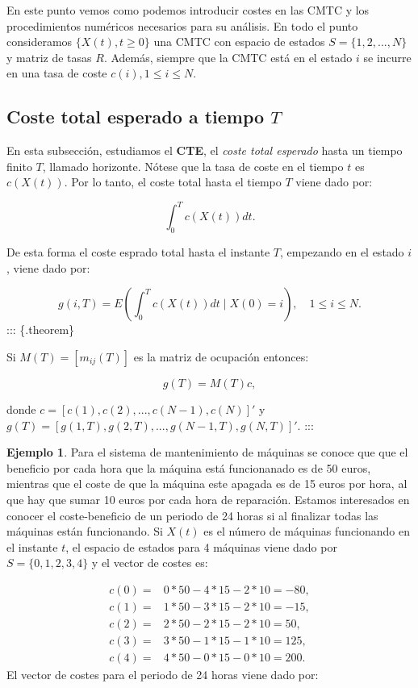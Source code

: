 \documentclass[
]{book}
\theoremstyle{definition}
\theoremstyle{definition}
\newtheorem{example}{Ejemplo}[chapter]
\theoremstyle{definition}
\theoremstyle{definition}
\theoremstyle{remark}
\begin{document}
En este punto vemos como podemos introducir costes en las CMTC y los procedimientos numéricos necesarios para su análisis. En todo el punto consideramos \(\{X(t), t \geq 0\}\) una CMTC con espacio de estados \(S = \{1, 2,...,N\}\) y matriz de tasas \(R\). Además, siempre que la CMTC está en el estado \(i\) se incurre en una tasa de coste \(c(i), 1 \leq i \leq N\).

\hypertarget{coste-total-esperado-a-tiempo-t}{%
\subsection{\texorpdfstring{Coste total esperado a tiempo \(T\)}{Coste total esperado a tiempo T}}\label{coste-total-esperado-a-tiempo-t}}

En esta subsección, estudiamos el \textbf{CTE}, el \emph{coste total esperado} hasta un tiempo finito \(T\), llamado horizonte. Nótese que la tasa de coste en el tiempo \(t\) es \(c(X(t))\). Por lo tanto, el coste total hasta el tiempo \(T\) viene dado por:

\[\int_0^T c(X(t))dt.\]

De esta forma el coste esprado total hasta el instante \(T\), empezando en el estado \(i\), viene dado por:

\[g(i, T) = E\left( \int_0^T c(X(t))dt \mid X(0) = i \right), \quad 1 \leq i \leq N.\] ::: \{.theorem\}

Si \(M(T) = [m_{ij}(T)]\) es la matriz de ocupación entonces:

\[g(T) = M(T)c,\]

donde \(c = [c(1), c(2),...,c(N-1), c(N)]'\) y \(g(T) = [g(1, T), g(2,T),..., g(N-1, T), g(N, T)]'.\) :::

\begin{example}
Para el sistema de mantenimiento de máquinas se conoce que que el beneficio por cada hora que la máquina está funcionanado es de 50 euros, mientras que el coste de que la máquina este apagada es de 15 euros por hora, al que hay que sumar 10 euros por cada hora de reparación. Estamos interesados en conocer el coste-beneficio de un periodo de 24 horas si al finalizar todas las máquinas están funcionando. Si \(X(t)\) es el número de máquinas funcionando en el instante \(t\), el espacio de estados para 4 máquinas viene dado por \(S = \{0, 1, 2, 3, 4\}\) y el vector de costes es:
\end{example}

\[
\begin{matrix}
c(0) = & 0*50 - 4*15 - 2*10 = - 80,\\
c(1) = & 1*50 - 3*15 - 2*10 = - 15,\\
c(2) = & 2*50 - 2*15 - 2*10 = 50,\\
c(3) = & 3*50 - 1*15 - 1*10 = 125,\\
c(4) = & 4*50 - 0*15 - 0*10 = 200.
\end{matrix}
\] El vector de costes para el periodo de 24 horas viene dado por:
\end{document}

